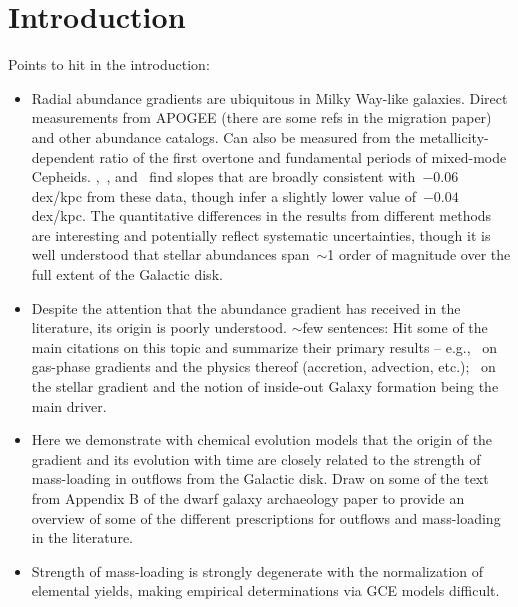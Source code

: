 
\section{Introduction}
\label{outflows:sec:intro}
\noindent
Points to hit in the introduction:
\begin{itemize}

	\item Radial abundance gradients are ubiquitous in Milky Way-like galaxies.
	Direct measurements from APOGEE (there are some refs in the migration
	paper) and other abundance catalogs.
	Can also be measured from the metallicity-dependent ratio of the first
	overtone and fundamental periods of mixed-mode Cepheids.
	\citet{Luck2011a},~\citet{Luck2011b}, and~\citet{Genovali2014} find slopes
	that are broadly consistent with~$-0.06$ dex/kpc from these data, though
	\citet{Lemasle2018} infer a slightly lower value of~$-0.04$ dex/kpc.
	The quantitative differences in the results from different methods are
	interesting and potentially reflect systematic uncertainties, though it is
	well understood that stellar abundances span~$\sim$1 order of magnitude
	over the full extent of the Galactic disk.

	\item Despite the attention that the abundance gradient has received in the
	literature, its origin is poorly understood.
	{\color{red} $\sim$few sentences:} Hit some of the main citations on this
	topic and summarize their primary results -- e.g.,~\citet{Sharda2021a,
	Sharda2021b} on gas-phase gradients and the physics thereof (accretion,
	advection, etc.);~\citet{Minchev2013, Minchev2014} on the stellar gradient
	and the notion of inside-out Galaxy formation being the main driver.

	\item Here we demonstrate with chemical evolution models that the origin
	of the gradient and its evolution with time are closely related to the
	strength of mass-loading in outflows from the Galactic disk.
	Draw on some of the text from Appendix B of the dwarf galaxy archaeology
	paper to provide an overview of some of the different prescriptions for
	outflows and mass-loading in the literature.

	\item Strength of mass-loading is strongly degenerate with the
	normalization of elemental yields, making empirical determinations via
	GCE models difficult.

\end{itemize}

